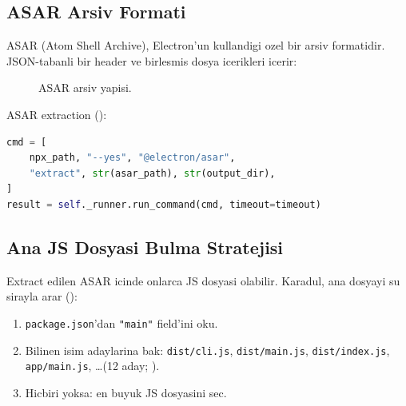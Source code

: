 \subsection{ASAR Arsiv Formati}

ASAR (Atom Shell Archive), Electron'un kullandigi ozel bir arsiv formatidir. JSON-tabanli bir header ve birlesmis dosya icerikleri icerir:

\begin{figure}[htbp]
\centering
{}
\caption{ASAR arsiv yapisi.}
\label{fig:asar-format}
\end{figure}

ASAR extraction ():
\begin{lstlisting}[language=Python, caption={ASAR extraction komutu}]
cmd = [
    npx_path, "--yes", "@electron/asar",
    "extract", str(asar_path), str(output_dir),
]
result = self._runner.run_command(cmd, timeout=timeout)
\end{lstlisting}

\subsection{Ana JS Dosyasi Bulma Stratejisi}

Extract edilen ASAR icinde onlarca JS dosyasi olabilir. Karadul, ana dosyayi su sirayla arar ():

\begin{enumerate}
\item \texttt{package.json}'dan \texttt{"main"} field'ini oku.
\item Bilinen isim adaylarina bak: \texttt{dist/cli.js}, \texttt{dist/main.js}, \texttt{dist/index.js}, \texttt{app/main.js}, \ldots (12 aday; ).
\item Hicbiri yoksa: en buyuk JS dosyasini sec.
\end{enumerate}



